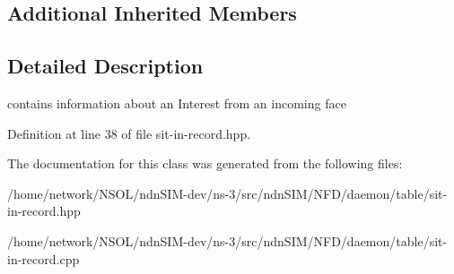 \subsection*{Additional Inherited Members}


\subsection{Detailed Description}
contains information about an Interest from an incoming face 

Definition at line 38 of file sit-\/in-\/record.\+hpp.



The documentation for this class was generated from the following files\+:\begin{DoxyCompactItemize}
\item 
/home/network/\+N\+S\+O\+L/ndn\+S\+I\+M-\/dev/ns-\/3/src/ndn\+S\+I\+M/\+N\+F\+D/daemon/table/sit-\/in-\/record.\+hpp\item 
/home/network/\+N\+S\+O\+L/ndn\+S\+I\+M-\/dev/ns-\/3/src/ndn\+S\+I\+M/\+N\+F\+D/daemon/table/sit-\/in-\/record.\+cpp\end{DoxyCompactItemize}
